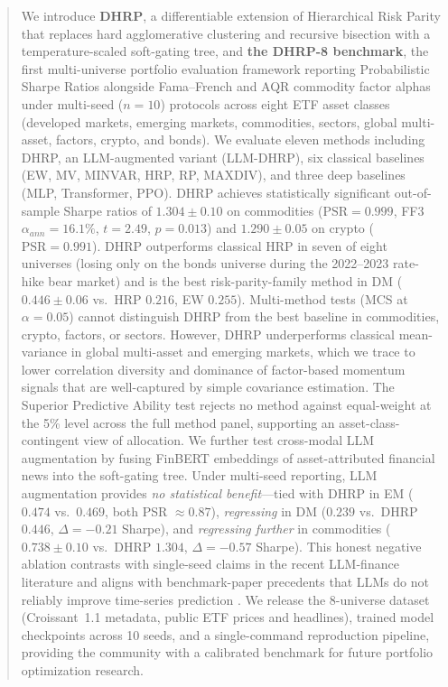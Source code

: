 \begin{abstract}
We introduce \textbf{DHRP}, a differentiable extension of Hierarchical Risk
Parity \citep{LopezdePrado2016} that replaces hard agglomerative clustering
and recursive bisection with a temperature-scaled soft-gating tree, and
\textbf{the DHRP-8 benchmark}, the first multi-universe portfolio
evaluation framework reporting Probabilistic Sharpe Ratios
\citep{Bailey2012PSR} alongside Fama--French
\citep{FamaFrench2015,Carhart1997} and AQR commodity factor alphas
\citep{AsnessMoskowitzPedersen2013} under multi-seed ($n=10$) protocols
across eight ETF asset classes (developed markets, emerging markets,
commodities, sectors, global multi-asset, factors, crypto, and bonds).
We evaluate eleven methods including DHRP, an LLM-augmented variant
(LLM-DHRP), six classical baselines (EW, MV, MINVAR, HRP, RP, MAXDIV),
and three deep baselines (MLP, Transformer, PPO).
%
DHRP achieves statistically significant out-of-sample Sharpe ratios of
$\mathbf{1.304 \pm 0.10}$ on commodities ($\text{PSR}=0.999$, FF3
$\alpha_{ann}=16.1\%$, $t=2.49$, $p=0.013$) and
$\mathbf{1.290 \pm 0.05}$ on crypto ($\text{PSR}=0.991$).
DHRP outperforms classical HRP in seven of eight universes
(losing only on the bonds universe during the 2022--2023 rate-hike
bear market) and is the best risk-parity-family method in DM
($0.446 \pm 0.06$ vs.\ HRP $0.216$, EW $0.255$). Multi-method tests
(MCS at $\alpha=0.05$) cannot distinguish DHRP from the best baseline in
commodities, crypto, factors, or sectors.
%
However, DHRP underperforms classical mean-variance in global
multi-asset and emerging markets, which we trace to lower correlation
diversity and dominance of factor-based momentum signals that are
well-captured by simple covariance estimation. The Superior Predictive
Ability test rejects no method against equal-weight at the 5\% level
across the full method panel, supporting an asset-class-contingent view
of allocation.
%
We further test cross-modal LLM augmentation by fusing FinBERT
\citep{Huang2023} embeddings of asset-attributed financial news into the
soft-gating tree. Under multi-seed reporting, LLM augmentation provides
\emph{no statistical benefit}---tied with DHRP in EM ($0.474$ vs.\
$0.469$, both PSR $\approx 0.87$), \emph{regressing} in DM ($0.239$ vs.\
DHRP $0.446$, $\Delta=-0.21$ Sharpe), and \emph{regressing further} in
commodities ($0.738 \pm 0.10$ vs.\ DHRP $1.304$, $\Delta=-0.57$ Sharpe).
This honest negative ablation contrasts with single-seed claims in the
recent LLM-finance literature \citep{Kirtac2025} and aligns with
benchmark-paper precedents that LLMs do not reliably improve time-series
prediction \citep{Tan2024AreLMs,Chen2025StockBench}.
%
We release the 8-universe dataset (Croissant~1.1 metadata, public ETF
prices and headlines), trained model checkpoints across 10 seeds, and a
single-command reproduction pipeline, providing the community with a
calibrated benchmark for future portfolio optimization research.
\end{abstract}
